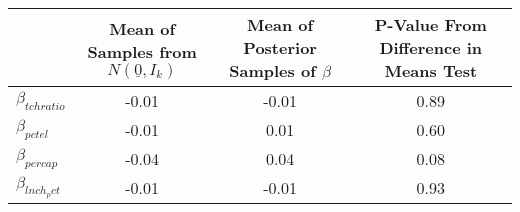 \begin{tabular}{lccc}
\toprule
 & Mean of Samples from $N(\underline{0}, I_k)$ & Mean of Posterior Samples of $\beta$ & P-Value From Difference in Means Test \\
\midrule
$\beta_{tchratio}$ & -0.01 & -0.01 & 0.89 \\
$\beta_{pctel}$ & -0.01 & 0.01 & 0.60 \\
$\beta_{percap}$ & -0.04 & 0.04 & 0.08 \\
$\beta_{lnch_pct}$ & -0.01 & -0.01 & 0.93 \\
\bottomrule
\end{tabular}
